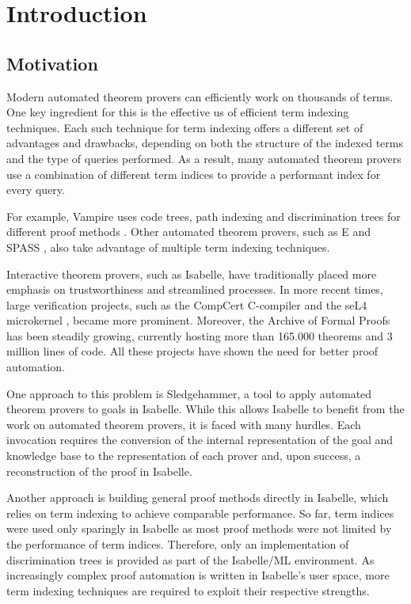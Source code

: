 \chapter{Introduction}\label{chapter:introduction}
\section{Motivation}
Modern automated theorem provers can efficiently work on thousands of terms.
One key ingredient for this is the effective us of efficient term indexing techniques.
Each such technique for term indexing offers a different set of advantages and drawbacks, depending on both the structure of the indexed terms and the type of queries performed. As a result, many automated theorem provers use a combination of different term indices to provide a performant index for every query.

For example, Vampire uses code trees, path indexing and discrimination trees for different proof methods \cite{riazanov_vampire_1999}. Other automated theorem provers, such as E \cite{schulz_system_2004} and SPASS \cite{weidenbach_spass_2009}, also take advantage of multiple term indexing techniques.

Interactive theorem provers, such as Isabelle, have traditionally placed more emphasis on trustworthiness and streamlined processes.
In more recent times, large verification projects, such as the CompCert C-compiler \cite{leroy_formally_2009} and the seL4 microkernel \cite{klein_sel4_2009}, became more prominent. Moreover, the Archive of Formal Proofs \cite{noauthor_archive_nodate} has been steadily growing, currently hosting more than 165.000 theorems and 3 million lines of code.
All these projects have shown the need for better proof automation.

One approach to this problem is Sledgehammer, a tool to apply automated theorem provers to goals in Isabelle. While this allows Isabelle to benefit from the work on automated theorem provers, it is faced with many hurdles. Each invocation requires the conversion of the internal representation of the goal and knowledge base to the representation of each prover and, upon success, a reconstruction of the proof in Isabelle. \cite{bohme_sledgehammer_2010,blanchette_more_2012}

Another approach is building general proof methods directly in Isabelle, which relies on term indexing to achieve comparable performance. So far, term indices were used only sparingly in Isabelle as most proof methods were not limited by the performance of term indices. Therefore, only an implementation of discrimination trees is provided as part of the Isabelle/ML environment. As increasingly complex proof automation is written in Isabelle's user space, more term indexing techniques are required to exploit their respective strengths.

